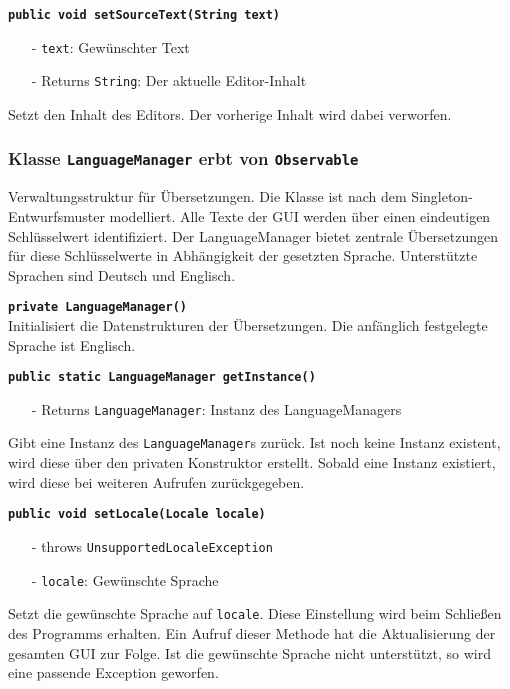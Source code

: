 \documentclass[parskip=full,11pt,twoside]{scrartcl}
\begin{document}
\textbf{\texttt{public void setSourceText(String text)}}
\begin{itemize}[noitemsep]
	\item[-] \texttt{text}: Gewünschter Text
	\item[-] Returns \texttt{String}: Der aktuelle Editor-Inhalt
\end{itemize}
Setzt den Inhalt des Editors. Der vorherige Inhalt wird dabei verworfen.

\subsubsection{Klasse \texttt{LanguageManager} erbt von \texttt{Observable}}

Verwaltungsstruktur für Übersetzungen. Die Klasse ist nach dem Singleton-Entwurfsmuster modelliert. Alle Texte der GUI werden über einen eindeutigen Schlüsselwert identifiziert. Der LanguageManager bietet zentrale Übersetzungen für diese Schlüsselwerte in Abhängigkeit der gesetzten Sprache. Unterstützte Sprachen sind Deutsch und Englisch.

\textbf{\texttt{private LanguageManager()}}\\
Initialisiert die Datenstrukturen der Übersetzungen. Die anfänglich festgelegte Sprache ist Englisch.

\textbf{\texttt{public static LanguageManager getInstance()}}
\begin{itemize}[noitemsep]
	\item[-] Returns \texttt{LanguageManager}: Instanz des LanguageManagers
\end{itemize}
Gibt eine Instanz des \texttt{LanguageManager}s zurück. Ist noch keine Instanz existent, wird diese über den privaten Konstruktor erstellt. Sobald eine Instanz existiert, wird diese bei weiteren Aufrufen zurückgegeben.

\textbf{\texttt{public void setLocale(Locale locale)}}
\begin{itemize}[noitemsep]
	\item[-] throws \texttt{UnsupportedLocaleException}
	\item[-] \texttt{locale}: Gewünschte Sprache
\end{itemize}
Setzt die gewünschte Sprache auf \texttt{locale}. Diese Einstellung wird beim Schließen des Programms erhalten. Ein Aufruf dieser Methode hat die Aktualisierung der gesamten GUI zur Folge. Ist die gewünschte Sprache nicht unterstützt, so wird eine passende Exception geworfen.
\end{document}
